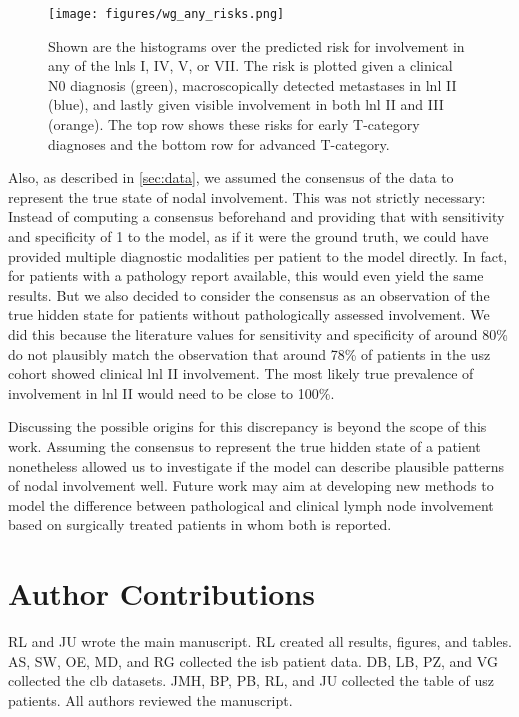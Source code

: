 \documentclass[twocolumn]{article}
\begin{document}
\begin{figure}
    \begin{centering}
        \texttt{[image: figures/wg\_any\_risks.png]}
        \caption{Shown are the histograms over the predicted risk for involvement in any of the \glspl{lnl} I, IV, V, or VII. The risk is plotted given a clinical N0 diagnosis (green), macroscopically detected metastases in \gls{lnl} II (blue), and lastly given visible involvement in both \gls{lnl} II and III (orange). The top row shows these risks for early T-category diagnoses and the bottom row for advanced T-category. \label{fig:wg_any_risks}}
    \end{centering}
\end{figure}

Also, as described in \cref{sec:data}, we assumed the consensus of the data to represent the true state of nodal involvement. This was not strictly necessary: Instead of computing a consensus beforehand and providing that with sensitivity and specificity of 1 to the model, as if it were the ground truth, we could have provided multiple diagnostic modalities per patient to the model directly. In fact, for patients with a pathology report available, this would even yield the same results. But we also decided to consider the consensus as an observation of the true hidden state for patients without pathologically assessed involvement. We did this because the literature values for sensitivity and specificity of around 80\% do not plausibly match the observation that around 78\% of patients in the \gls{usz} cohort showed clinical \gls{lnl} II involvement. The most likely true prevalence of involvement in \gls{lnl} II would need to be close to 100\%.

Discussing the possible origins for this discrepancy is beyond the scope of this work. Assuming the consensus to represent the true hidden state of a patient nonetheless allowed us to investigate if the model can describe plausible patterns of nodal involvement well. Future work may aim at developing new methods to model the difference between pathological and clinical lymph node involvement based on surgically treated patients in whom both is reported.


\section*{Author Contributions}

RL and JU wrote the main manuscript. RL created all results, figures, and tables. AS, SW, OE, MD, and RG collected the \gls{isb} patient data. DB, LB, PZ, and VG collected the \gls{clb} datasets. JMH, BP, PB, RL, and JU collected the table of \gls{usz} patients. All authors reviewed the manuscript.
\end{document}
